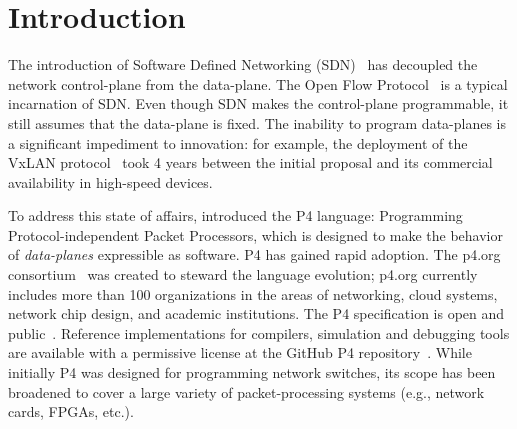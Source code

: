  \section{Introduction}\label{sec:introduction}

The introduction of Software Defined Networking (SDN)~\cite{rfc7426}
has decoupled the network control-plane from the data-plane.  The Open
Flow Protocol~\cite{mckeown-ccr08} is a typical incarnation of SDN.
Even though SDN makes the control-plane programmable, it still assumes
that the {data-plane} is fixed.  The inability to program data-planes
is a significant impediment to innovation: for example, the deployment
of the VxLAN protocol~\cite{rfc7348} took 4 years between the initial
proposal and its commercial availability in high-speed devices.

To address this state of affairs, \cite{bosshart-ccr14} introduced the
P4 language: Programming Protocol-independent Packet Processors, which
is designed to make the behavior of \emph{data-planes} expressible as
software.  P4 has gained rapid adoption.  The p4.org
consortium~\cite{p4org} was created to steward the language evolution;
p4.org currently includes more than 100 organizations in the areas of
networking, cloud systems, network chip design, and academic
institutions.  The P4 specification is open and
public~\cite{p416-spec17}.  Reference implementations for compilers,
simulation and debugging tools are available with a permissive license
at the GitHub P4 repository~\cite{p4lang}.  While initially P4 was
designed for programming network switches, its scope has been
broadened to cover a large variety of packet-processing systems (e.g.,
network cards, FPGAs, etc.).
